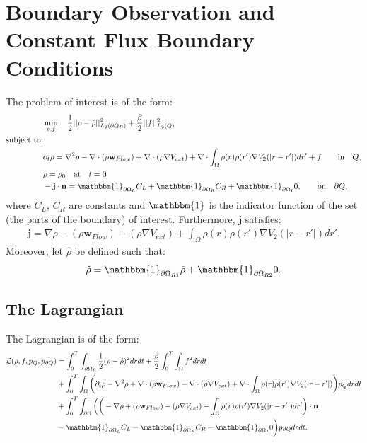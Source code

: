 \documentclass[11pt, a4paper]{article}
\newcommand{\Sta}{\rho}
\newcommand{\Adja}{{p}_Q}
\newcommand{\Adjc}{p_{\partial Q}}
\newcommand{\Con}{{f}}
\newcommand{\nor}{\mathbf{n}}
\theoremstyle{definition}
\begin{document}
\section{Boundary Observation and Constant Flux Boundary Conditions}
The problem of interest is of the form:
\begin{align*}
&\min_{\Sta, \Con} \quad \frac{1}{2}|| \Sta -\hat \Sta||^2_{L_2(\partial Q_R)} + \frac{\beta}{2}|| \Con||^2_{L_2(Q)}\\
\text{subject to:}\\
&\partial_t \rho = \nabla^2 \rho - \nabla \cdot (\rho \mathbf{w}_{Flow}) +\nabla \cdot (\rho \nabla V_{ext}) + \nabla \cdot \int_\Omega \rho(r) \rho(r') \nabla V_2(|r-r'|) dr' + \Con \quad  \quad\text{in} \quad Q,\notag\\
& \rho = \rho_0 \quad \text{at} \quad t=0 \notag\\
& - \mathbf{j} \cdot \nor = \mathbbm{1}_{\partial \Omega_L} C_L +\mathbbm{1}_{\partial \Omega_R} C_R +\mathbbm{1}_{\partial \Omega_I} 0, \quad  \quad\text{on} \quad \partial Q, 
\end{align*}
where $C_L$, $C_R$ are constants and $\mathbbm{1}$ is the indicator function of the set (the parts of the boundary) of interest.
Furthermore, $\mathbf{j}$ satisfies:
\begin{align*}
\mathbf{j}=\nabla \rho - (\rho \mathbf{w}_{Flow}) +(\rho \nabla V_{ext}) +  \int_\Omega \rho(r) \rho(r') \nabla V_2(|r-r'|) dr'.
\end{align*}
Moreover, let $\hat \Sta$ be defined such that:
\begin{align*}
\hat \Sta = \mathbbm{1}_{\partial \Omega_{R1}} \tilde \Sta  +\mathbbm{1}_{\partial \Omega_{R2}} 0.
\end{align*}
\subsection*{The Lagrangian}
The Lagrangian is of the form:
\begin{align*}
\mathcal{L}(\Sta,\Con,\Adja,\Adjc ) &= \int_0^T \int_{\partial \Omega_R} \frac{1}{2}(\Sta - \hat \Sta)^2 dr dt + \frac{\beta}{2}\int_0^T \int_\Omega \Con^2 drdt \\
&+ \int_0^T \int_\Omega \bigg( \partial_t \rho - \nabla^2 \rho + \nabla \cdot (\rho \mathbf{w}_{Flow}) -\nabla \cdot (\rho \nabla V_{ext}) + \nabla \cdot \int_\Omega \rho(r) \rho(r') \nabla V_2(|r-r'|) \bigg) \Adja dr dt\\
&+ \int_0^T \int_{\partial \Omega} \bigg(  \bigg(-\nabla \rho+ (\rho \mathbf{w}_{Flow}) -(\rho \nabla V_{ext}) -  \int_\Omega \rho(r) \rho(r') \nabla V_2(|r-r'|) dr' \bigg)\cdot \nor\\
& -\mathbbm{1}_{\partial \Omega_L} C_L -\mathbbm{1}_{\partial \Omega_R} C_R -\mathbbm{1}_{\partial \Omega_I} 0 \bigg) \Adjc dr dt.
\end{align*}
\end{document}
